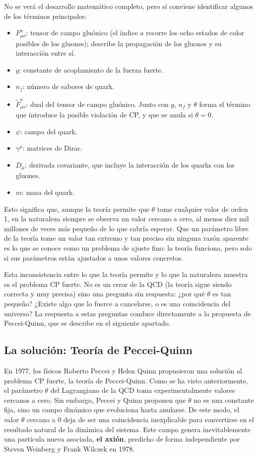 No se verá el desarrollo matemático completo, pero sí conviene identificar algunos de los términos principales:

\begin{itemize}
	\item $F_{\mu\nu}^a$: tensor de campo gluónico (el índice $a$ recorre los ocho estados de color posibles de los gluones); describe la propagación de los gluones y su interacción entre sí.
	\item $g$: constante de acoplamiento de la fuerza fuerte.
	\item $n_f$: número de sabores de quark.
	\item $\tilde{F}_{\mu\nu}^a$: dual del tensor de campo gluónico. Junto con $g$, $n_f$ y $\theta$ forma el término que introduce la posible violación de CP, y que se anula si $\theta=0$.
	\item $\psi$: campo del quark.
	\item $\gamma^\mu$: matrices de Dirac.
	\item $D_\mu$: derivada covariante, que incluye la interacción de los quarks con los gluones.
	\item $m$: masa del quark.
\end{itemize}

Esto significa que, aunque la teoría permite que $\theta$ tome cualquier valor de orden 1, en la naturaleza siempre se observa un valor cercano a cero, al menos diez mil millones de veces más pequeño de lo que cabría esperar. 
Que un parámetro libre de la teoría tome un valor tan extremo y tan preciso sin ninguna razón aparente es lo que se conoce como un problema de ajuste fino: la teoría funciona, pero solo si sus parámetros están ajustados a unos valores concretos.


Esta inconsistencia entre lo que la teoría permite y lo que la naturaleza muestra es el problema CP fuerte. No es un error de la QCD (la teoría sigue siendo correcta y muy precisa) sino una pregunta sin respuesta: 
¿por qué $\theta$ es tan pequeño? ¿Existe algo que lo fuerce a cancelarse, o es una coincidencia del universo? La respuesta a estas preguntas conduce directamente a la propuesta de Peccei-Quinn, que se describe en el siguiente apartado.


\subsection{La solución: Teoría de Peccei-Quinn}
\label{sec:solucion-peccei-quinn}

En 1977, los físicos Roberto Peccei y Helen Quinn propusieron una solución al problema CP fuerte, la teoría de Peccei-Quinn. Como se ha visto anteriormente, el parámetro $\theta$ del Lagrangiano de la QCD toma experimentalmente 
valores cercanos a cero. Sin embargo, Peccei y Quinn proponen que $\theta$ no es una constante fija, sino un campo dinámico que evoluciona hasta anularse. De este modo, el valor $\theta$ cercano a 0 deja de ser una coincidencia 
inexplicable para convertirse en el resultado natural de la dinámica del sistema.
Este campo genera inevitablemente una partícula nueva asociada, \textbf{el axión}, predicho de forma independiente por Steven Weinberg y Frank Wilczek en 1978.


